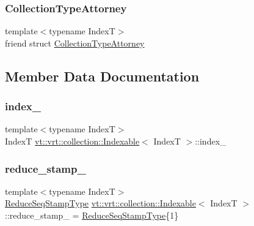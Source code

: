 \subsubsection{\texorpdfstring{Collection\+Type\+Attorney}{CollectionTypeAttorney}}
{\footnotesize\ttfamily template$<$typename IndexT$>$ \\
friend struct \hyperlink{structvt_1_1vrt_1_1collection_1_1_collection_type_attorney}{Collection\+Type\+Attorney}\hspace{0.3cm}{\ttfamily [friend]}}



\subsection{Member Data Documentation}
\mbox{\label{structvt_1_1vrt_1_1collection_1_1_indexable_aa238a04594333c44308be2a063b3b70a}} 
\subsubsection{\texorpdfstring{index\+\_\+}{index\_}}
{\footnotesize\ttfamily template$<$typename IndexT$>$ \\
IndexT \hyperlink{structvt_1_1vrt_1_1collection_1_1_indexable}{vt\+::vrt\+::collection\+::\+Indexable}$<$ IndexT $>$\+::index\+\_\+\hspace{0.3cm}{\ttfamily [private]}}

\mbox{\label{structvt_1_1vrt_1_1collection_1_1_indexable_a43424bdf00b61b9c0d4d05ee693d31f2}} 
\subsubsection{\texorpdfstring{reduce\+\_\+stamp\+\_\+}{reduce\_stamp\_}}
{\footnotesize\ttfamily template$<$typename IndexT$>$ \\
\hyperlink{structvt_1_1vrt_1_1collection_1_1_indexable_af259d608ccabcbe13680763fe5f1c656}{Reduce\+Seq\+Stamp\+Type} \hyperlink{structvt_1_1vrt_1_1collection_1_1_indexable}{vt\+::vrt\+::collection\+::\+Indexable}$<$ IndexT $>$\+::reduce\+\_\+stamp\+\_\+ = \hyperlink{structvt_1_1vrt_1_1collection_1_1_indexable_af259d608ccabcbe13680763fe5f1c656}{Reduce\+Seq\+Stamp\+Type}\{1\}\hspace{0.3cm}{\ttfamily [protected]}}


